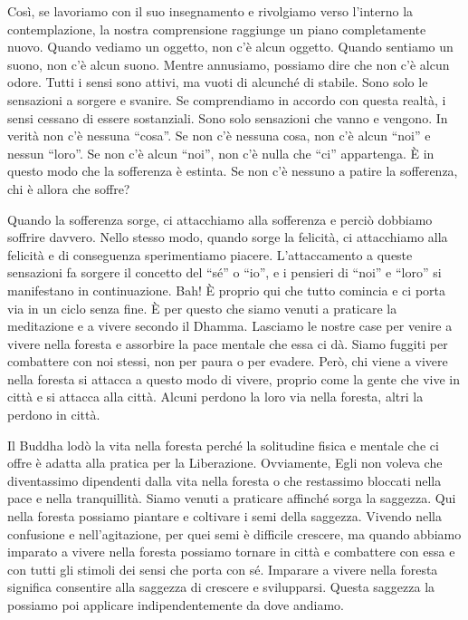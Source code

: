 Così, se lavoriamo con il suo insegnamento e rivolgiamo verso l'interno
la contemplazione, la nostra comprensione raggiunge un piano
completamente nuovo. Quando vediamo un oggetto, non c'è alcun oggetto.
Quando sentiamo un suono, non c'è alcun suono. Mentre annusiamo,
possiamo dire che non c'è alcun odore. Tutti i sensi sono attivi, ma
vuoti di alcunché di stabile. Sono solo le sensazioni a sorgere e
svanire. Se comprendiamo in accordo con questa realtà, i sensi cessano
di essere sostanziali. Sono solo sensazioni che vanno e vengono. In
verità non c'è nessuna ``cosa''. Se non c'è nessuna cosa, non c'è alcun
``noi'' e nessun ``loro''. Se non c'è alcun ``noi'', non c'è nulla che
``ci'' appartenga. È in questo modo che la sofferenza è estinta. Se non
c'è nessuno a patire la sofferenza, chi è allora che soffre?

Quando la sofferenza sorge, ci attacchiamo alla sofferenza e perciò
dobbiamo soffrire davvero. Nello stesso modo, quando sorge la felicità,
ci attacchiamo alla felicità e di conseguenza sperimentiamo piacere.
L'attaccamento a queste sensazioni fa sorgere il concetto del ``sé'' o
``io'', e i pensieri di ``noi'' e ``loro'' si manifestano in
continuazione. Bah! È proprio qui che tutto comincia e ci porta via in
un ciclo senza fine. È per questo che siamo venuti a praticare la
meditazione e a vivere secondo il Dhamma. Lasciamo le nostre case per
venire a vivere nella foresta e assorbire la pace mentale che essa ci
dà. Siamo fuggiti per combattere con noi stessi, non per paura o per
evadere. Però, chi viene a vivere nella foresta si attacca a questo modo
di vivere, proprio come la gente che vive in città e si attacca alla
città. Alcuni perdono la loro via nella foresta, altri la perdono in
città.

Il Buddha lodò la vita nella foresta perché la solitudine fisica e
mentale che ci offre è adatta alla pratica per la Liberazione.
Ovviamente, Egli non voleva che diventassimo dipendenti dalla vita nella
foresta o che restassimo bloccati nella pace e nella tranquillità. Siamo
venuti a praticare affinché sorga la saggezza. Qui nella foresta
possiamo piantare e coltivare i semi della saggezza. Vivendo nella
confusione e nell'agitazione, per quei semi è difficile crescere, ma
quando abbiamo imparato a vivere nella foresta possiamo tornare in città
e combattere con essa e con tutti gli stimoli dei sensi che porta con
sé. Imparare a vivere nella foresta significa consentire alla saggezza
di crescere e svilupparsi. Questa saggezza la possiamo poi applicare
indipendentemente da dove andiamo.

